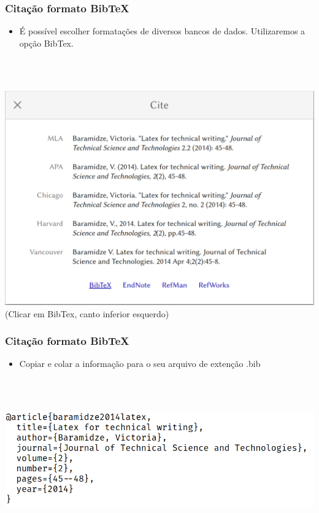 \documentclass{beamer}
\begin{document}
	\begin{frame}

	  \frametitle{Citação formato BibTeX}

	  \begin{itemize}
	  \item É possível escolher formatações de diversos bancos de
	    dados. Utilizaremos a opção BibTex.
	\end{itemize}

	\\~~

	\begin{center}
	  \includegraphics[scale=0.15]{../Imagens/A2I103.png}
	  (Clicar em BibTex, canto inferior esquerdo)
	\end{center}


	\end{frame}

	\begin{frame}

	  \frametitle{Citação formato BibTeX}

	  \begin{itemize}
	  \item Copiar e colar a informação para o seu arquivo de extenção .bib
	\end{itemize}

	\\~~

	\begin{center}
	  \includegraphics[scale=0.30]{../Imagens/A2I104.png}
	\end{center}


	\end{frame}
\end{document}
